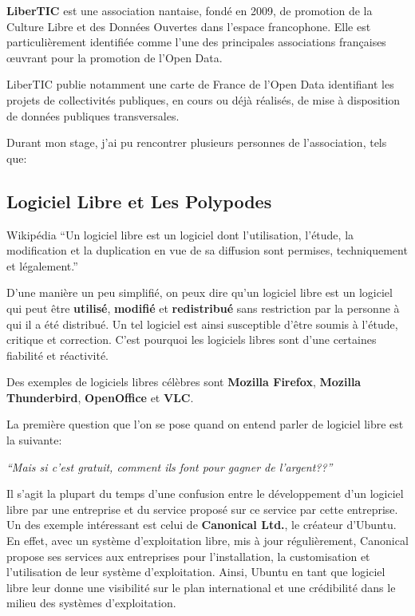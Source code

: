 
\textbf{LiberTIC} est une association nantaise, fondé en 2009, de promotion de la Culture Libre et des Données Ouvertes dans l'espace francophone. Elle est particulièrement identifiée comme l'une des principales associations françaises œuvrant pour la promotion de l'Open Data.

LiberTIC publie notamment une carte de France de l'Open Data identifiant les projets de collectivités publiques, en cours ou déjà réalisés, de mise à disposition de données publiques transversales.

Durant mon stage, j'ai pu rencontrer plusieurs personnes de l'association, tels que:


\subsection{Logiciel Libre et Les Polypodes}

\begin{aquote}{Wikipédia}
``Un logiciel libre est un logiciel dont l'utilisation, l'étude, la modification et la duplication en vue de sa diffusion sont permises, techniquement et légalement.''
\end{aquote}

D'une manière un peu simplifié, on peux dire qu'un logiciel libre est un logiciel qui peut être \textbf{utilisé}, \textbf{modifié} et \textbf{redistribué} sans restriction par la personne à qui il a été distribué. Un tel logiciel est ainsi susceptible d'être soumis à l'étude, critique et correction. C'est pourquoi les logiciels libres sont d'une certaines fiabilité et réactivité.

Des exemples de logiciels libres célèbres sont \textbf{Mozilla Firefox}, \textbf{Mozilla Thunderbird}, \textbf{OpenOffice} et \textbf{VLC}.

La première question que l'on se pose quand on entend parler de logiciel libre est la suivante:

\textit{``Mais si c'est gratuit, comment ils font pour gagner de l'argent??''}

Il s'agit la plupart du temps d'une confusion entre le développement d'un logiciel libre par une entreprise et du service proposé sur ce service par cette entreprise. Un des exemple intéressant est celui de \textbf{Canonical Ltd.}, le créateur d'Ubuntu. En effet, avec un système d'exploitation libre, mis à jour régulièrement, Canonical propose ses services aux entreprises pour l'installation, la customisation et l'utilisation de leur système d'exploitation. Ainsi, Ubuntu en tant que logiciel libre leur donne une visibilité sur le plan international et une crédibilité dans le milieu des systèmes d'exploitation.

